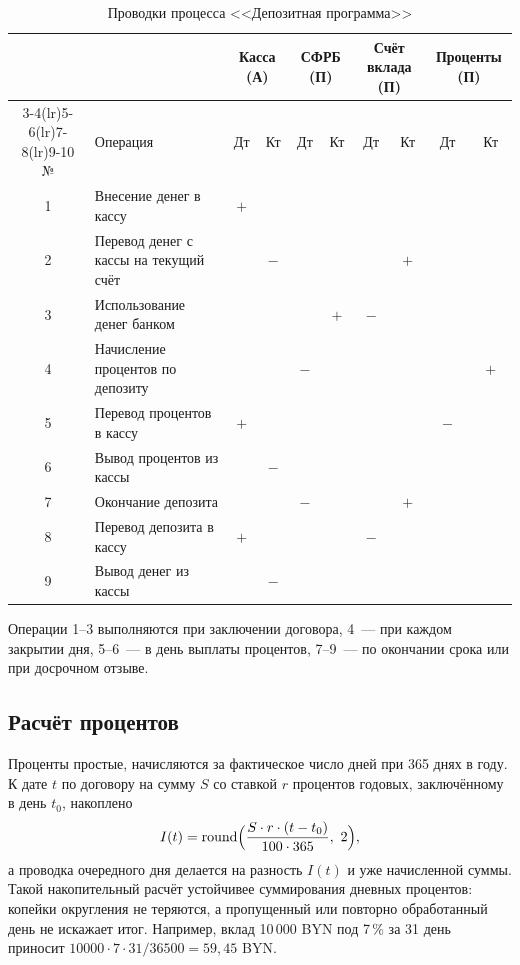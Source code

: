 \documentclass[14pt,a4paper]{extarticle}
\begin{document}
\begin{table}[H]
\caption{Проводки процесса <<Депозитная программа>>}
\label{tab:postings}
\centering
\footnotesize
\setlength{\tabcolsep}{4.5pt}
\begin{tabular}{clcccccccc}
\toprule
 & & \multicolumn{2}{c}{Касса (А)} & \multicolumn{2}{c}{СФРБ (П)} & \multicolumn{2}{c}{Счёт вклада (П)} & \multicolumn{2}{c}{Проценты (П)} \\
\cmidrule(lr){3-4}\cmidrule(lr){5-6}\cmidrule(lr){7-8}\cmidrule(lr){9-10}
№ & Операция & Дт & Кт & Дт & Кт & Дт & Кт & Дт & Кт \\
\midrule
1 & Внесение денег в кассу & $+$ & & & & & & & \\
2 & Перевод денег с кассы на текущий счёт & & $-$ & & & & $+$ & & \\
3 & Использование денег банком & & & & $+$ & $-$ & & & \\
\midrule
4 & Начисление процентов по депозиту & & & $-$ & & & & & $+$ \\
5 & Перевод процентов в кассу & $+$ & & & & & & $-$ & \\
6 & Вывод процентов из кассы & & $-$ & & & & & & \\
\midrule
7 & Окончание депозита & & & $-$ & & & $+$ & & \\
8 & Перевод депозита в кассу & $+$ & & & & $-$ & & & \\
9 & Вывод денег из кассы & & $-$ & & & & & & \\
\bottomrule
\end{tabular}
\end{table}

Операции 1--3 выполняются при заключении договора, 4~--- при каждом закрытии дня,
5--6~--- в день выплаты процентов, 7--9~--- по окончании срока или при досрочном отзыве.

\subsection{Расчёт процентов}

Проценты простые, начисляются за фактическое число дней при 365 днях в году. К дате
$t$ по договору на сумму $S$ со ставкой $r$ процентов годовых, заключённому в день $t_0$,
накоплено
\begin{equation}
I(t) = \operatorname{round}\Bigl(\frac{S \cdot r \cdot (t - t_0)}{100 \cdot 365},\ 2\Bigr),
\label{eq:interest}
\end{equation}
а проводка очередного дня делается на разность $I(t)$ и уже начисленной суммы. Такой
накопительный расчёт устойчивее суммирования дневных процентов: копейки округления не
теряются, а пропущенный или повторно обработанный день не искажает итог. Например, вклад
10\,000 BYN под 7\,\% за 31 день приносит $10000 \cdot 7 \cdot 31 / 36500 = 59{,}45$ BYN.
\end{document}
